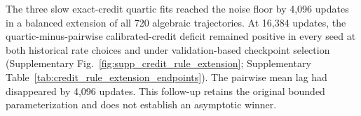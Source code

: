 The three slow exact-credit quartic fits reached the noise floor by 4,096 updates in a balanced extension of all 720 algebraic trajectories. At 16,384 updates, the quartic-minus-pairwise calibrated-credit deficit remained positive in every seed at both historical rate choices and under validation-based checkpoint selection (Supplementary Fig.~\ref{fig:supp_credit_rule_extension}; Supplementary Table~\ref{tab:credit_rule_extension_endpoints}). The pairwise mean lag had disappeared by 4,096 updates. This follow-up retains the original bounded parameterization and does not establish an asymptotic winner.

